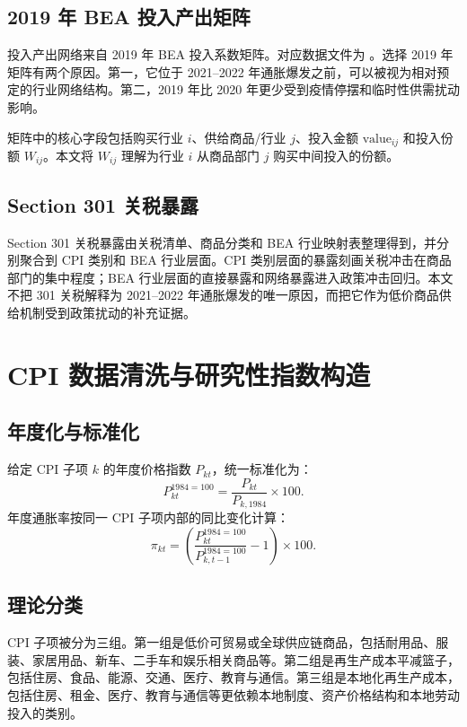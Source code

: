 \documentclass[12pt,a4paper,fontset=none]{ctexart}
\begin{document}
\subsection{2019 年 BEA 投入产出矩阵}

投入产出网络来自 2019 年 BEA 投入系数矩阵。对应数据文件为 。选择 2019 年矩阵有两个原因。第一，它位于 2021--2022 年通胀爆发之前，可以被视为相对预定的行业网络结构。第二，2019 年比 2020 年更少受到疫情停摆和临时性供需扰动影响。

矩阵中的核心字段包括购买行业 \(i\)、供给商品/行业 \(j\)、投入金额 \(\text{value}_{ij}\) 和投入份额 \(W_{ij}\)。本文将 \(W_{ij}\) 理解为行业 \(i\) 从商品部门 \(j\) 购买中间投入的份额。

\subsection{Section 301 关税暴露}

Section 301 关税暴露由关税清单、商品分类和 BEA 行业映射表整理得到，并分别聚合到 CPI 类别和 BEA 行业层面。CPI 类别层面的暴露刻画关税冲击在商品部门的集中程度；BEA 行业层面的直接暴露和网络暴露进入政策冲击回归。本文不把 301 关税解释为 2021--2022 年通胀爆发的唯一原因，而把它作为低价商品供给机制受到政策扰动的补充证据。

\section{CPI 数据清洗与研究性指数构造}

\subsection{年度化与标准化}

给定 CPI 子项 \(k\) 的年度价格指数 \(P_{kt}\)，统一标准化为：
\begin{equation}
P^{1984=100}_{kt}=\frac{P_{kt}}{P_{k,1984}}\times 100.
\end{equation}
年度通胀率按同一 CPI 子项内部的同比变化计算：
\begin{equation}
\pi_{kt}
=\left(\frac{P^{1984=100}_{kt}}{P^{1984=100}_{k,t-1}}-1\right)\times 100.
\end{equation}

\subsection{理论分类}

CPI 子项被分为三组。第一组是低价可贸易或全球供应链商品，包括耐用品、服装、家居用品、新车、二手车和娱乐相关商品等。第二组是再生产成本平减篮子，包括住房、食品、能源、交通、医疗、教育与通信。第三组是本地化再生产成本，包括住房、租金、医疗、教育与通信等更依赖本地制度、资产价格结构和本地劳动投入的类别。
\end{document}
